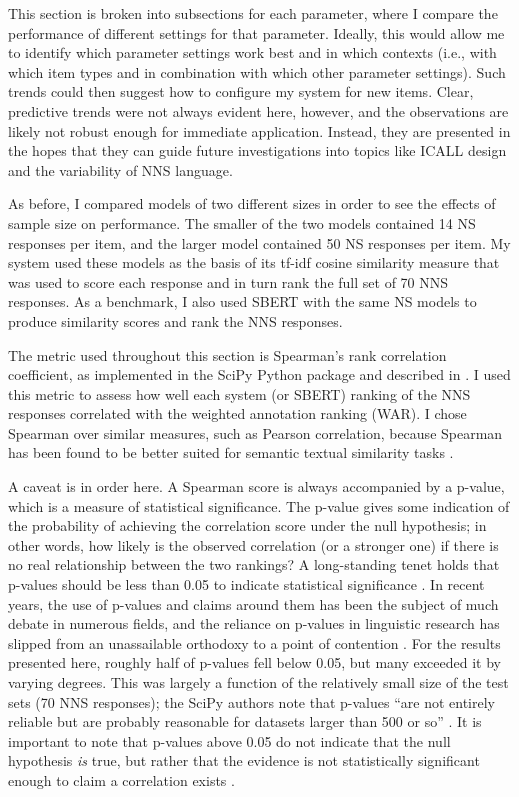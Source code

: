 This section is broken into subsections for each parameter, where I compare the performance of different settings for that parameter. Ideally, this would allow me to identify which parameter settings work best and in which contexts (i.e., with which item types and in combination with which other parameter settings). Such trends could then suggest how to configure my system for new items. Clear, predictive trends were not always evident here, however, and the observations are likely not robust enough for immediate application. Instead, they are presented in the hopes that they can guide future investigations into topics like ICALL design and the variability of NNS language.

As before, I compared models of two different sizes in order to see the effects of sample size on performance. The smaller of the two models contained 14 NS responses per item, and the larger model contained 50 NS responses per item. My system used these models as the basis of its tf-idf cosine similarity measure that was used to score each response and in turn rank the full set of 70 NNS responses. As a benchmark, I also used SBERT with the same NS models to produce similarity scores and rank the NNS responses.

The metric used throughout this section is Spearman's rank correlation coefficient, as implemented in the SciPy Python package \cite{2020scipy} and described in \citet{zwillinger1999crc}. I used this metric to assess how well each system (or SBERT) ranking of the NNS responses correlated with the weighted annotation ranking (WAR). I chose Spearman over similar measures, such as Pearson correlation, because Spearman has been found to be better suited for semantic textual similarity tasks \cite{reimers2016}.

A caveat is in order here. A Spearman score is always accompanied by a p-value, which is a measure of statistical significance. The p-value gives some indication of the probability of achieving the correlation score under the null hypothesis; in other words, how likely is the observed correlation (or a stronger one) if there is no real relationship between the two rankings? A long-standing tenet holds that p-values should be less than 0.05 to indicate statistical significance \cite{zar1972significance}. In recent years, the use of p-values and claims around them has been the subject of much debate in numerous fields, and the reliance on p-values in linguistic research has slipped from an unassailable orthodoxy to a point of contention \cite{moran2012revisiting, tomczak2014need}. For the results presented here, roughly half of p-values fell below 0.05, but many exceeded it by varying degrees. This was largely a function of the relatively small size of the test sets (70 NNS responses); the SciPy authors note that p-values ``are not entirely reliable but are probably reasonable for datasets larger than 500 or so'' \cite{2020scipy}. It is important to note that p-values above 0.05 do not indicate that the null hypothesis \textit{is} true, but rather that the evidence is not statistically significant enough to claim a correlation exists \cite{vasishth2016statistical}.

